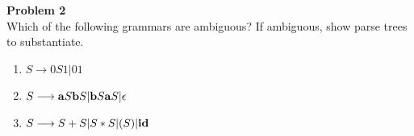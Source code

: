 \documentclass[a4paper, 11pt]{article}
\newenvironment{problem}[2][Problem]
    { \begin{mdframed}[backgroundcolor=gray!20] \textbf{#1 #2} \\}
    {  \end{mdframed}}
\begin{document}

\begin{problem}{2}
Which of the following grammars are ambiguous? If ambiguous, show parse trees to substantiate.

\begin{enumerate}[a]
    \item $S \longrightarrow 0 S 1 | 0 1 $
    \item $S \longrightarrow {\bf a} S {\bf b} S | {\bf b} S {\bf a} S | \epsilon $
    \item $S \longrightarrow  S + S | S * S | (S) | {\bf id}  $
\end{enumerate}

\end{problem}
\end{document}
